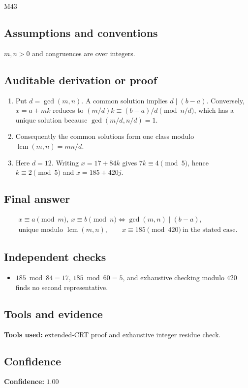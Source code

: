 \documentclass[11pt]{article}
\begin{document}
\begin{mprsolution}{M43}
\subsection*{Assumptions and conventions}
\(m,n>0\) and congruences are over integers.
\subsection*{Auditable derivation or proof}
\begin{enumerate}[label=\textbf{Step \arabic*:},leftmargin=*]
\item Put \(d=\gcd(m,n)\).  A common solution implies \(d\mid(b-a)\).
Conversely, \(x=a+mk\) reduces to
\((m/d)k\equiv(b-a)/d\pmod{n/d}\), which has a unique solution because
\(\gcd(m/d,n/d)=1\).
\item Consequently the common solutions form one class modulo
\(\operatorname{lcm}(m,n)=mn/d\).
\item Here \(d=12\).  Writing \(x=17+84k\) gives
\(7k\equiv4\pmod5\), hence \(k\equiv2\pmod5\) and \(x=185+420j\).
\end{enumerate}
\subsection*{Final answer}
\[
\boxed{\begin{gathered}
x\equiv a\pmod m,\ x\equiv b\pmod n
\iff \gcd(m,n)\mid(b-a),\\
\text{unique modulo }\operatorname{lcm}(m,n),\qquad
x\equiv185\pmod{420}\ \text{in the stated case}.
\end{gathered}}
\]
\subsection*{Independent checks}
\begin{itemize}[leftmargin=*]
\item \(185\bmod84=17\), \(185\bmod60=5\), and exhaustive checking modulo
\(420\) finds no second representative.
\end{itemize}
\subsection*{Tools and evidence}
\textbf{Tools used:} extended-CRT proof and exhaustive integer residue check.
\subsection*{Confidence}
\textbf{Confidence:} \(1.00\)
\end{mprsolution}
\end{document}
